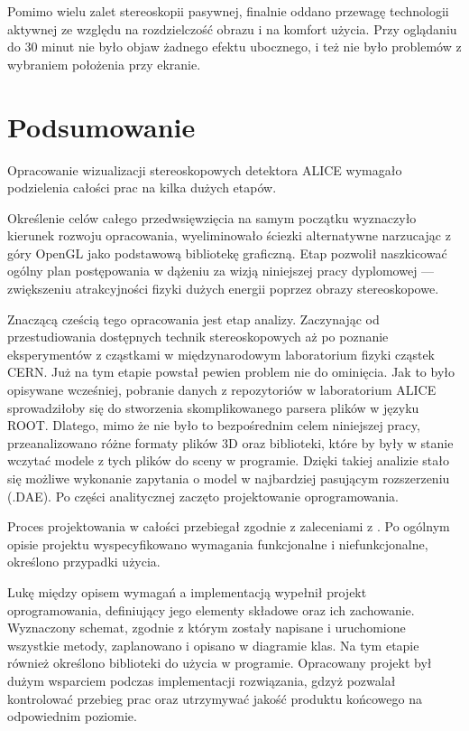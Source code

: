 Pomimo wielu zalet stereoskopii pasywnej, finalnie oddano przewagę technologii aktywnej ze względu na rozdzielczość obrazu i na komfort użycia. Przy oglądaniu do 30 minut nie było objaw żadnego efektu ubocznego, i też nie było problemów z wybraniem położenia przy ekranie.

\newpage
\section{Podsumowanie}
Opracowanie wizualizacji stereoskopowych detektora ALICE wymagało podzielenia całości prac na kilka dużych etapów.

Określenie celów całego przedwsięwzięcia na samym początku wyznaczyło kierunek rozwoju opracowania, wyeliminowało ściezki alternatywne narzucając z góry OpenGL jako podstawową bibliotekę graficzną. Etap pozwolił naszkicować ogólny plan postępowania w dążeniu za wizją niniejszej pracy dyplomowej --- zwiększeniu atrakcyjności fizyki dużych energii poprzez obrazy stereoskopowe. 

Znaczącą cześcią tego opracowania jest etap analizy. Zaczynając od przestudiowania dostępnych technik stereoskopowych aż po poznanie eksperymentów z cząstkami w międzynarodowym laboratorium fizyki cząstek CERN. Już na tym etapie powstał pewien problem nie do ominięcia. Jak to było opisywane wcześniej, pobranie danych z repozytoriów w laboratorium ALICE sprowadziłoby się do stworzenia skomplikowanego parsera plików w języku ROOT. Dlatego, mimo że nie było to bezpośrednim celem niniejszej pracy, przeanalizowano różne formaty plików 3D oraz biblioteki, które by były w stanie wczytać modele z tych plików do sceny w programie. Dzięki takiej analizie stało się możliwe wykonanie zapytania o model w najbardziej pasującym rozszerzeniu (.DAE). Po części analitycznej zaczęto projektowanie oprogramowania.

Proces projektowania w całości przebiegał zgodnie z zaleceniami z \cite{specyfikacja}. Po ogólnym opisie projektu wyspecyfikowano wymagania funkcjonalne i niefunkcjonalne, określono przypadki użycia.

Lukę między opisem wymagań a implementacją wypełnił projekt oprogramowania, definiujący jego elementy składowe oraz ich zachowanie. Wyznaczony schemat, zgodnie z którym zostały napisane i uruchomione wszystkie metody, zaplanowano i opisano w diagramie klas. Na tym etapie również określono biblioteki do użycia w programie. Opracowany projekt był dużym wsparciem podczas implementacji rozwiązania, gdzyż pozwalał kontrolować przebieg prac oraz utrzymywać jakość produktu końcowego na odpowiednim poziomie.

